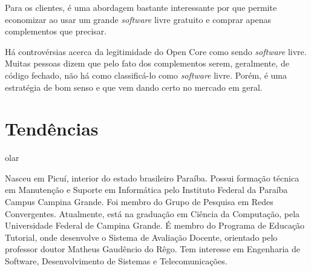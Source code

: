 \documentclass{classe_cn}                 %
\begin{document}
Para os clientes, é uma abordagem bastante interessante por que permite economizar ao usar um grande \textit{software} livre gratuito e comprar apenas complementos que precisar.

Há controvérsias acerca da legitimidade do Open Core como sendo \textit{software} livre. Muitas pessoas dizem que pelo fato dos complementos serem, geralmente, de código fechado, não há como classificá-lo como \textit{software} livre. Porém, é uma estratégia de bom senso e que vem dando certo no mercado em geral.

\section{Tendências}

olar



\vspace{1.0cm}
  Nasceu em Picuí, interior do estado brasileiro Paraíba. Possui formação técnica em Manutenção e Suporte em Informática pelo Instituto Federal da Paraíba Campus Campina Grande. Foi membro do Grupo de Pesquisa em Redes Convergentes. Atualmente, está na graduação em Ciência da Computação, pela Universidade Federal de Campina Grande. É membro do Programa de Educação Tutorial, onde desenvolve o Sistema de Avaliação Docente, orientado pelo professor doutor Matheus Gaudêncio do Rêgo. Tem interesse em Engenharia de Software, Desenvolvimento de Sistemas e Telecomunicações.
\end{document}
